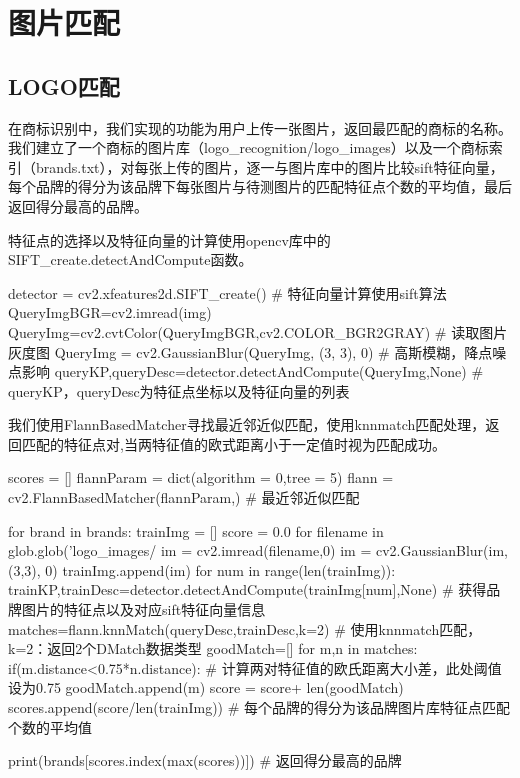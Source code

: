 
\chapter{图片匹配}

\section{LOGO匹配}

在商标识别中，我们实现的功能为用户上传一张图片，返回最匹配的商标的名称。我们建立了一个商标的图片库（logo_recognition/logo_images）以及一个商标索引（brands.txt），对每张上传的图片，逐一与图片库中的图片比较sift特征向量，每个品牌的得分为该品牌下每张图片与待测图片的匹配特征点个数的平均值，最后返回得分最高的品牌。

特征点的选择以及特征向量的计算使用opencv库中的SIFT_create.detectAndCompute函数。

\begin{python}
detector = cv2.xfeatures2d.SIFT_create() # 特征向量计算使用sift算法
QueryImgBGR=cv2.imread(img)
QueryImg=cv2.cvtColor(QueryImgBGR,cv2.COLOR_BGR2GRAY) # 读取图片灰度图
QueryImg = cv2.GaussianBlur(QueryImg, (3, 3), 0) # 高斯模糊，降点噪点影响
queryKP,queryDesc=detector.detectAndCompute(QueryImg,None) # queryKP，queryDesc为特征点坐标以及特征向量的列表
\end{python}

我们使用FlannBasedMatcher寻找最近邻近似匹配，使用knnmatch匹配处理，返回匹配的特征点对,当两特征值的欧式距离小于一定值时视为匹配成功。

\begin{python}
scores = []
flannParam = dict(algorithm = 0,tree = 5)
flann = cv2.FlannBasedMatcher(flannParam,{}) # 最近邻近似匹配

for brand in brands:
    trainImg = []
    score = 0.0
    for filename in glob.glob('logo_images/%
        im = cv2.imread(filename,0)
        im = cv2.GaussianBlur(im, (3,3), 0)
        trainImg.append(im)
    for num in range(len(trainImg)):
        trainKP,trainDesc=detector.detectAndCompute(trainImg[num],None) # 获得品牌图片的特征点以及对应sift特征向量信息
        matches=flann.knnMatch(queryDesc,trainDesc,k=2) # 使用knnmatch匹配，k=2：返回2个DMatch数据类型
        goodMatch=[]
        for m,n in matches:
            if(m.distance<0.75*n.distance): # 计算两对特征值的欧氏距离大小差，此处阈值设为0.75
                goodMatch.append(m)
        score = score+ len(goodMatch)
    scores.append(score/len(trainImg)) # 每个品牌的得分为该品牌图片库特征点匹配个数的平均值

print(brands[scores.index(max(scores))]) # 返回得分最高的品牌
\end{python}

